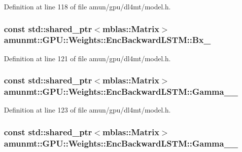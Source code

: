 Definition at line 118 of file amun/gpu/dl4mt/model.\+h.

\subsubsection[{\texorpdfstring{Bx\+\_\+}{Bx_}}]{\setlength{\rightskip}{0pt plus 5cm}const std\+::shared\+\_\+ptr$<${\bf mblas\+::\+Matrix}$>$ amunmt\+::\+G\+P\+U\+::\+Weights\+::\+Enc\+Backward\+L\+S\+T\+M\+::\+Bx\+\_\+}\hypertarget{structamunmt_1_1GPU_1_1Weights_1_1EncBackwardLSTM_abb85155bf8cfe781437f871fd24bf6f3}{}\label{structamunmt_1_1GPU_1_1Weights_1_1EncBackwardLSTM_abb85155bf8cfe781437f871fd24bf6f3}


Definition at line 121 of file amun/gpu/dl4mt/model.\+h.

\subsubsection[{\texorpdfstring{Gamma\+\_\+1\+\_\+}{Gamma_1_}}]{\setlength{\rightskip}{0pt plus 5cm}const std\+::shared\+\_\+ptr$<${\bf mblas\+::\+Matrix}$>$ amunmt\+::\+G\+P\+U\+::\+Weights\+::\+Enc\+Backward\+L\+S\+T\+M\+::\+Gamma\+\_\+\_\+}\hypertarget{structamunmt_1_1GPU_1_1Weights_1_1EncBackwardLSTM_a6c3aa1f64727d1223f1ee14c55d86673}{}\label{structamunmt_1_1GPU_1_1Weights_1_1EncBackwardLSTM_a6c3aa1f64727d1223f1ee14c55d86673}


Definition at line 123 of file amun/gpu/dl4mt/model.\+h.

\subsubsection[{\texorpdfstring{Gamma\+\_\+2\+\_\+}{Gamma_2_}}]{\setlength{\rightskip}{0pt plus 5cm}const std\+::shared\+\_\+ptr$<${\bf mblas\+::\+Matrix}$>$ amunmt\+::\+G\+P\+U\+::\+Weights\+::\+Enc\+Backward\+L\+S\+T\+M\+::\+Gamma\+\_\+\_\+}\hypertarget{structamunmt_1_1GPU_1_1Weights_1_1EncBackwardLSTM_a37952b54d98f1cc98ba5ef18cdd6b2da}{}\label{structamunmt_1_1GPU_1_1Weights_1_1EncBackwardLSTM_a37952b54d98f1cc98ba5ef18cdd6b2da}


